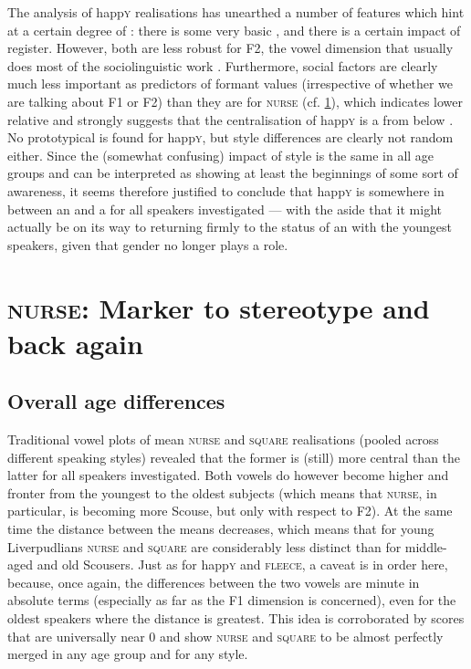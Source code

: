 The analysis of happ\textsc{y} realisations has unearthed a number of features which hint at a certain degree of : there is some very basic , and there is a certain impact of register.
However, both are less robust for F2, the vowel dimension that usually does most of the sociolinguistic work \parencite[cf.][502]{labov2006a}.
Furthermore, social factors are clearly much less important as predictors of formant values (irrespective of whether we are talking about F1 or F2) than they are for \textsc{nurse} (cf. \ref{prod.disc.nurse}), which indicates lower relative  and strongly suggests that the centralisation of happ\textsc{y} is a  from below \parencite[cf.][78]{labov1994}.
No prototypical  is found for happ\textsc{y}, but style differences are clearly not random either.
Since the (somewhat confusing) impact of style is the same in all age groups and can be interpreted as showing at least the beginnings of some sort of awareness, it seems therefore justified to conclude that happ\textsc{y} is somewhere in between an  and a  for all speakers investigated --- with the aside that it might actually be on its way to returning firmly to the status of an  with the youngest speakers, given that gender no longer plays a role.

\section{\textsc{nurse}: Marker to stereotype and back again}
\label{prod.disc.nurse}

\subsection{Overall age differences}
\label{prod.disc.nurse.age}

Traditional vowel plots of mean \textsc{nurse} and \textsc{square} realisations (pooled across different speaking styles) revealed that the former is (still) more central than the latter for all speakers investigated.
Both vowels do however become higher and fronter from the youngest to the oldest subjects (which means that \textsc{nurse}, in particular, is becoming more Scouse, but only with respect to F2).
At the same time the distance between the means decreases, which means that for young Liverpudlians \textsc{nurse} and \textsc{square} are considerably less distinct than for middle-aged and old Scousers.
Just as for happ\textsc{y} and \textsc{fleece}, a caveat is in order here, because, once again, the differences between the two vowels are minute in absolute terms (especially as far as the F1 dimension is concerned), even for the oldest speakers where the distance is greatest.
This idea is corroborated by  scores that are universally near 0 and show \textsc{nurse} and \textsc{square} to be almost perfectly merged in any age group and for any style.

